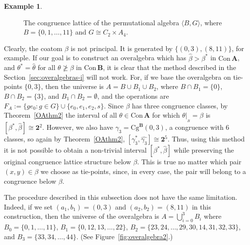 \documentclass[cm,dissertation,actual,final]{uhthesis}
\theoremstyle{plain}
\theoremstyle{definition}
\newtheorem{example}[theorem]{Example}
\theoremstyle{remark}
\numberwithin{theorem}{section}
\numberwithin{claim}{chapter}
\numberwithin{equation}{section}
\numberwithin{conjecture}{chapter}
\newcommand{\<}{\ensuremath{\langle}}
\renewcommand{\>}{\ensuremath{\rangle}}
\renewcommand{\ngeq}{\ensuremath{\ngeqslant}}
\newcommand{\Cg}{\ensuremath{\mathrm{Cg}}}
\newcommand{\Con}{\ensuremath{\mathrm{Con\,}}}
\newcommand{\Sub}{\ensuremath{\mathrm{Sub}}}
\newcommand{\0}{\ensuremath{\mathbf{0}}}
\newcommand{\1}{\ensuremath{\mathbf{1}}}
\newcommand{\2}{\ensuremath{\mathbf{2}}}
\newcommand{\3}{\ensuremath{\mathbf{3}}}
\newcommand{\4}{\ensuremath{\mathbf{4}}}
\newcommand{\5}{\ensuremath{\mathbf{5}}}
\newcommand{\bA}{\ensuremath{\mathbf{A}}}
\newcommand{\bB}{\ensuremath{\mathbf{B}}}
\newcommand{\resB}{\ensuremath{|_{_B}}}
\newcommand{\two}{\ensuremath{\mathbf{2}}}
\begin{document}
\begin{example}
\begin{figure}[h!]
    \caption{%
      The congruence lattice of the permutational algebra $\<B, G\>$, where 
      $B = \{0, 1, \dots, 11\}$ and $G\cong C_2 \times A_4$.}
    \label{fig:OverAlgebra-C2xA4}
  \end{figure}

  Clearly, the coatom $\beta$ is not principal.  
  It is generated by $\{(0,3), (8,11)\}$, for example. 
  If our goal is to construct an overalgebra which has $\widehat{\beta} > \beta^*$
  in $\Con \bA$, and $\theta^* = \widehat{\theta}$ for all $\theta \ngeq \beta$ in
  $\Con\bB$, it is clear that the method described in the 
  Section~\ref{sec:overalgebras-i} will not work.
  For, if we base the overalgebra on tie-points $\{0,3\}$, then the universe is $A
  = B \cup B_1 \cup B_2$, where $B\cap B_1 = \{0\}$,  $B\cap B_2 = \{3\}$, and
  $B_1 \cap B_2 = \emptyset$, and the operations are $F_A := \{g e_0 : g\in G\}
  \cup \{e_0, e_1, e_2, s\}$. 
  Since $\beta$ has three congruence classes, by Theorem~\ref{OAthm2}
  the interval of all $\theta \in \Con\bA$ for which 
  $\theta\resB = \beta$ is $[\beta^*, \widehat{\beta}] \cong \two^2$.
  However, we also have $\gamma_3 =\Cg^\bB(0, 3)$, a congruence with 6 classes, so 
  again by Theorem~\ref{OAthm2}, $[\gamma_3^*, \widehat{\gamma_3}]\cong
  \two^5$.
  Thus, using this method it is not possible to obtain a non-trivial
  interval $[\beta^*, \widehat{\beta}]$ while preserving the original congruence
  lattice structure below $\beta$.  This is true no matter which pair $(x,y) \in
  \beta$ we choose as tie-points, since, in every case, the pair will belong to a
  congruence below $\beta$. 

  The procedure described in this subsection %
  does not have the same limitation.
  Indeed, if we set $(a_1, b_1) = (0, 3)$ and $(a_2, b_2) = (8, 11)$ in this 
  construction, then the universe of the overalgebra is $A =
  \bigcup_{i=0}^3 B_i$ where
  $B_0 = \{0, 1, \dots, 11 \}$, 
  $B_1 = \{0, 12, 13, \dots, 22 \}$,
  $B_2 = \{ 23, 24, \dots, 29, 30, 14, 31, 32, 33 \}$, and
  $B_3 = \{ 33, 34, \dots, 44 \}$.  (See Figure~\ref{fig:overalgebra2}.)

  \begin{figure}[h!]
    \centering
        {
          }
\end{figure}
\end{example}
\end{document}
